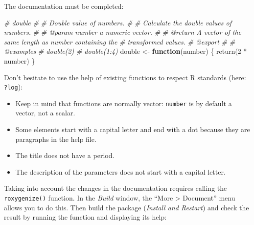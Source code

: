 \documentclass[
  12pt,
  american,
  a4paper,
  extrafontsizes,onecolumn,openright
  ]{memoir}
\newenvironment{Shaded}{\begin{snugshade}}{\end{snugshade}}
\newcommand{\CommentTok}[1]{\textcolor[rgb]{0.56,0.35,0.01}{\textit{#1}}}
\newcommand{\ControlFlowTok}[1]{\textcolor[rgb]{0.13,0.29,0.53}{\textbf{#1}}}
\newcommand{\DecValTok}[1]{\textcolor[rgb]{0.00,0.00,0.81}{#1}}
\newcommand{\FunctionTok}[1]{\textcolor[rgb]{0.00,0.00,0.00}{#1}}
\newcommand{\NormalTok}[1]{#1}
\newcommand{\OtherTok}[1]{\textcolor[rgb]{0.56,0.35,0.01}{#1}}
\newcommand{\SpecialCharTok}[1]{\textcolor[rgb]{0.00,0.00,0.00}{#1}}
\providecommand{\tightlist}{%
  \setlength{\itemsep}{0pt}\setlength{\parskip}{0pt}}
\begin{document}
The documentation must be completed:

\scriptsize

\begin{Shaded}
\begin{Highlighting}[]
\CommentTok{\#\textquotesingle{} double}
\CommentTok{\#\textquotesingle{} }
\CommentTok{\#\textquotesingle{} Double value of numbers.}
\CommentTok{\#\textquotesingle{}}
\CommentTok{\#\textquotesingle{} Calculate the double values of numbers.}
\CommentTok{\#\textquotesingle{} }
\CommentTok{\#\textquotesingle{} @param number a numeric vector.}
\CommentTok{\#\textquotesingle{}}
\CommentTok{\#\textquotesingle{} @return A vector of the same length as \textasciigrave{}number\textasciigrave{} containing the }
\CommentTok{\#\textquotesingle{}   transformed values.}
\CommentTok{\#\textquotesingle{} @export}
\CommentTok{\#\textquotesingle{}}
\CommentTok{\#\textquotesingle{} @examples}
\CommentTok{\#\textquotesingle{} double(2)}
\CommentTok{\#\textquotesingle{} double(1:4)}
\NormalTok{double }\OtherTok{\textless{}{-}} \ControlFlowTok{function}\NormalTok{(number) \{}
    \FunctionTok{return}\NormalTok{(}\DecValTok{2} \SpecialCharTok{*}\NormalTok{ number)}
\NormalTok{\}}
\end{Highlighting}
\end{Shaded}

\normalsize

Don't hesitate to use the help of existing functions to respect R standards (here: \texttt{?log}):

\begin{itemize}
\tightlist
\item
  Keep in mind that functions are normally vector: \texttt{number} is by default a vector, not a scalar.
\item
  Some elements start with a capital letter and end with a dot because they are paragraphs in the help file.
\item
  The title does not have a period.
\item
  The description of the parameters does not start with a capital letter.
\end{itemize}

Taking into account the changes in the documentation requires calling the \texttt{roxygenize()} function.
In the \emph{Build} window, the \enquote{More \textgreater{} Document} menu allows you to do this.
Then build the package (\emph{Install and Restart}) and check the result by running the function and displaying its help:
\end{document}
